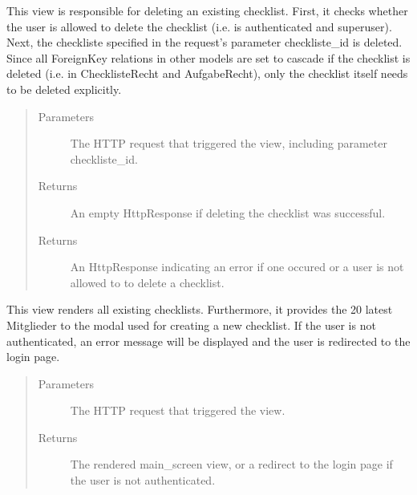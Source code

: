 \documentclass[letterpaper,10pt,english]{sphinxmanual}
\begin{document}
\begin{fulllineitems}
\label{\detokenize{masterCodeDoc:checklisten.views.loeschen}}
This view is responsible for deleting an existing checklist.
First, it checks whether the user is allowed to delete the checklist (i.e. is authenticated and superuser).
Next, the checkliste specified in the request’s parameter checkliste\_id is deleted. 
Since all ForeignKey relations in other models are set to cascade if the checklist is deleted (i.e. in ChecklisteRecht and AufgabeRecht), only the checklist itself needs to be deleted explicitly.
\begin{quote}\begin{description}
\item[{Parameters}] \leavevmode
{} \textendash{} The HTTP request that triggered the view, including parameter checkliste\_id.

\item[{Returns}] \leavevmode
An empty HttpResponse if deleting the checklist was successful.

\item[{Returns}] \leavevmode
An HttpResponse indicating an error if one occured or a user is not allowed to to delete a checklist.

\end{description}\end{quote}

\end{fulllineitems}


\begin{fulllineitems}
\label{\detokenize{masterCodeDoc:checklisten.views.main_screen}}
This view renders all existing checklists. Furthermore, it provides the 20 latest Mitglieder to the modal used for creating a new checklist.
If the user is not authenticated, an error message will be displayed and the user is redirected to the login page.
\begin{quote}\begin{description}
\item[{Parameters}] \leavevmode
{} \textendash{} The HTTP request that triggered the view.

\item[{Returns}] \leavevmode
The rendered main\_screen view, or a redirect to the login page if the user is not authenticated.

\end{description}\end{quote}

\end{fulllineitems}
\end{document}
